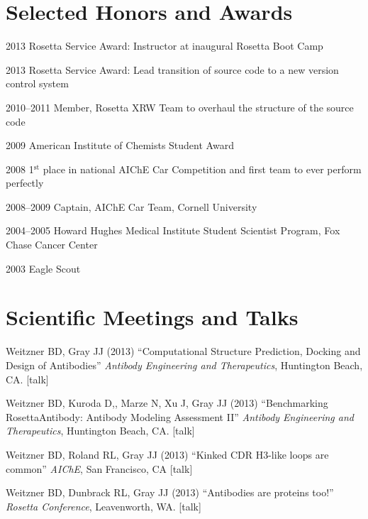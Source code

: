 \documentclass[12pt]{scrartcl}
\begin{document}
\section{\lsstyle Selected Honors and Awards}
\begin{CV}
\item[2013] Rosetta Service Award: Instructor at inaugural Rosetta Boot Camp
\item[2013] Rosetta Service Award: Lead transition of source code to a new version control system
\item[2010--2011] Member, Rosetta XRW Team to overhaul the structure of the source code
\item[2009] American Institute of Chemists Student Award
\item[2008] 1$^\text{st}$ place in national AIChE Car Competition and first team to ever perform perfectly
\item[2008--2009] Captain, AIChE Car Team, Cornell University
\item[2004--2005] Howard Hughes Medical Institute Student Scientist Program, Fox Chase Cancer Center
\item[2003] Eagle Scout
\end{CV}

\pagebreak
\section{\lsstyle Scientific Meetings and Talks}
\noindent Weitzner BD, Gray JJ (2013) ``Computational Structure Prediction, Docking and Design of Antibodies'' \textit{Antibody Engineering and Therapeutics}, Huntington Beach, CA. [talk]

\vspace{0.75\baselineskip}

\noindent Weitzner BD, Kuroda D,, Marze N, Xu J, Gray JJ (2013) ``Benchmarking RosettaAntibody: Antibody Modeling Assessment II'' \textit{Antibody Engineering and Therapeutics}, Huntington Beach, CA. [talk]

\vspace{0.75\baselineskip}

\noindent Weitzner BD, Roland RL, Gray JJ (2013) ``Kinked CDR H3-like loops are common'' \textit{AIChE}, San Francisco, CA [talk]

\vspace{0.75\baselineskip}

\noindent Weitzner BD, Dunbrack RL, Gray JJ (2013) ``Antibodies are proteins too!'' \textit{Rosetta Conference}, Leavenworth, WA. [talk]
\end{document}
